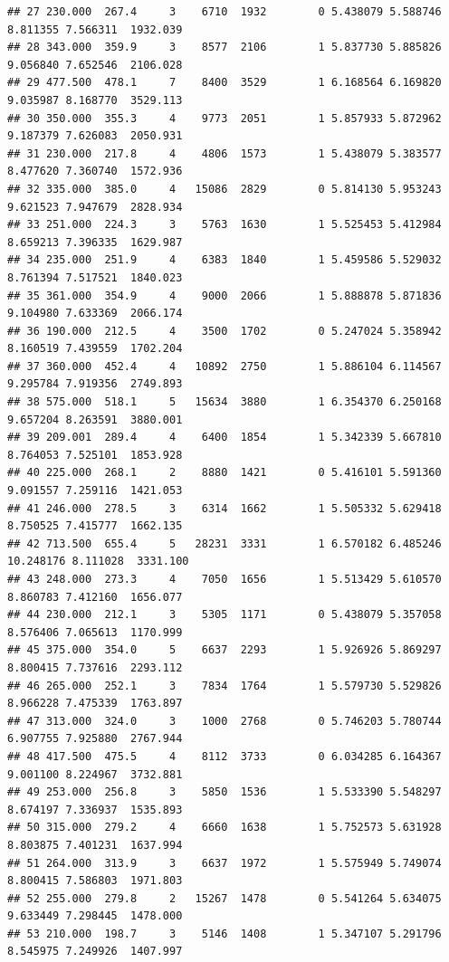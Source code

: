 \documentclass[
]{book}
\theoremstyle{definition}
\theoremstyle{definition}
\theoremstyle{definition}
\theoremstyle{definition}
\theoremstyle{remark}
\begin{document}
\begin{verbatim}
## 27 230.000  267.4     3    6710  1932        0 5.438079 5.588746  8.811355 7.566311  1932.039
## 28 343.000  359.9     3    8577  2106        1 5.837730 5.885826  9.056840 7.652546  2106.028
## 29 477.500  478.1     7    8400  3529        1 6.168564 6.169820  9.035987 8.168770  3529.113
## 30 350.000  355.3     4    9773  2051        1 5.857933 5.872962  9.187379 7.626083  2050.931
## 31 230.000  217.8     4    4806  1573        1 5.438079 5.383577  8.477620 7.360740  1572.936
## 32 335.000  385.0     4   15086  2829        0 5.814130 5.953243  9.621523 7.947679  2828.934
## 33 251.000  224.3     3    5763  1630        1 5.525453 5.412984  8.659213 7.396335  1629.987
## 34 235.000  251.9     4    6383  1840        1 5.459586 5.529032  8.761394 7.517521  1840.023
## 35 361.000  354.9     4    9000  2066        1 5.888878 5.871836  9.104980 7.633369  2066.174
## 36 190.000  212.5     4    3500  1702        0 5.247024 5.358942  8.160519 7.439559  1702.204
## 37 360.000  452.4     4   10892  2750        1 5.886104 6.114567  9.295784 7.919356  2749.893
## 38 575.000  518.1     5   15634  3880        1 6.354370 6.250168  9.657204 8.263591  3880.001
## 39 209.001  289.4     4    6400  1854        1 5.342339 5.667810  8.764053 7.525101  1853.928
## 40 225.000  268.1     2    8880  1421        0 5.416101 5.591360  9.091557 7.259116  1421.053
## 41 246.000  278.5     3    6314  1662        1 5.505332 5.629418  8.750525 7.415777  1662.135
## 42 713.500  655.4     5   28231  3331        1 6.570182 6.485246 10.248176 8.111028  3331.100
## 43 248.000  273.3     4    7050  1656        1 5.513429 5.610570  8.860783 7.412160  1656.077
## 44 230.000  212.1     3    5305  1171        0 5.438079 5.357058  8.576406 7.065613  1170.999
## 45 375.000  354.0     5    6637  2293        1 5.926926 5.869297  8.800415 7.737616  2293.112
## 46 265.000  252.1     3    7834  1764        1 5.579730 5.529826  8.966228 7.475339  1763.897
## 47 313.000  324.0     3    1000  2768        0 5.746203 5.780744  6.907755 7.925880  2767.944
## 48 417.500  475.5     4    8112  3733        0 6.034285 6.164367  9.001100 8.224967  3732.881
## 49 253.000  256.8     3    5850  1536        1 5.533390 5.548297  8.674197 7.336937  1535.893
## 50 315.000  279.2     4    6660  1638        1 5.752573 5.631928  8.803875 7.401231  1637.994
## 51 264.000  313.9     3    6637  1972        1 5.575949 5.749074  8.800415 7.586803  1971.803
## 52 255.000  279.8     2   15267  1478        0 5.541264 5.634075  9.633449 7.298445  1478.000
## 53 210.000  198.7     3    5146  1408        1 5.347107 5.291796  8.545975 7.249926  1407.997

\end{verbatim}
\end{document}
